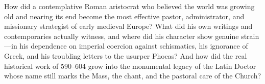 How did a contemplative Roman aristocrat who believed the world was growing old
and nearing its end become the most effective pastor, administrator, and
missionary strategist of early medieval Europe? What did his own writings and
contemporaries actually witness, and where did his character show genuine
strain---in his dependence on imperial coercion against schismatics, his
ignorance of Greek, and his troubling letters to the usurper Phocas? And how
did the real historical work of 590--604 grow into the monumental legacy of the
Latin Doctor whose name still marks the Mass, the chant, and the pastoral care
of the Church?
